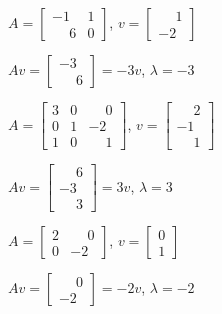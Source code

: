 \documentclass[12pt]{exam}
\begin{document}
\begin{exercicio}
    $A = \begin{bmatrix}-1 & 1\\\phantom{-}6 & 0\end{bmatrix}$, $v = \begin{bmatrix}\phantom{-}1\\-2\end{bmatrix}$
    \begin{solucao}
        $Av = \begin{bmatrix}-3\\\phantom{-}6\end{bmatrix} = -3v$, $\lambda = -3$
    \end{solucao}
\end{exercicio}

\begin{exercicio}
    $A = \begin{bmatrix}3 & 0 & \phantom{-}0\\0 & 1 & -2\\1 & 0 & \phantom{-}1\end{bmatrix}$, $v = \begin{bmatrix}\phantom{-}2\\-1\\\phantom{-}1\end{bmatrix}$
    \begin{solucao}
        $Av = \begin{bmatrix}\phantom{-}6\\-3\\\phantom{-}3\end{bmatrix} = 3v$, $\lambda = 3$
    \end{solucao}
\end{exercicio}

\begin{exercicio}
    $A = \begin{bmatrix}2 & \phantom{-}0\\0 & -2\end{bmatrix}$, $v = \begin{bmatrix}0\\1\end{bmatrix}$
    \begin{solucao}
        $Av = \begin{bmatrix}\phantom{-}0\\-2\end{bmatrix} = -2v$, $\lambda = -2$
    \end{solucao}
\end{exercicio}
\end{document}
